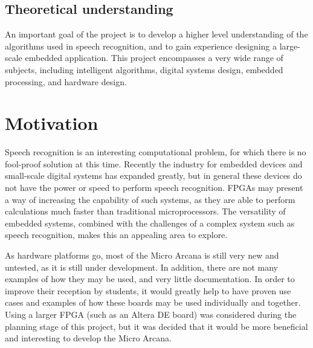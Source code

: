 	\subsection{Theoretical understanding} %
	\label{sec:theoretical_understanding}
		An important goal of the project is to develop a higher level understanding of the algorithms used in speech recognition, and to gain experience designing a large-scale embedded application.  This project encompasses a very wide range of subjects, including intelligent algorithms, digital systems design, embedded processing, and hardware design.



\section{Motivation} %
\label{sec:motivation}
	Speech recognition is an interesting computational problem, for which there is no fool-proof solution at this time.  Recently the industry for embedded devices and small-scale digital systems has expanded greatly, but in general these devices do not have the power or speed to perform speech recognition.  FPGAs may present a way of increasing the capability of such systems, as they are able to perform calculations much faster than traditional microprocessors.  The versatility of embedded systems, combined with the challenges of a complex system such as speech recognition, makes this an appealing area to explore.

	As hardware platforms go, most of the Micro Arcana is still very new and untested, as it is still under development.  In addition, there are not many examples of how they may be used, and very little documentation.  In order to improve their reception by students, it would greatly help to have proven use cases and examples of how these boards may be used individually and together.  Using a larger FPGA (such as an Altera DE board) was considered during the planning stage of this project, but it was decided that it would be more beneficial and interesting to develop the Micro Arcana.


